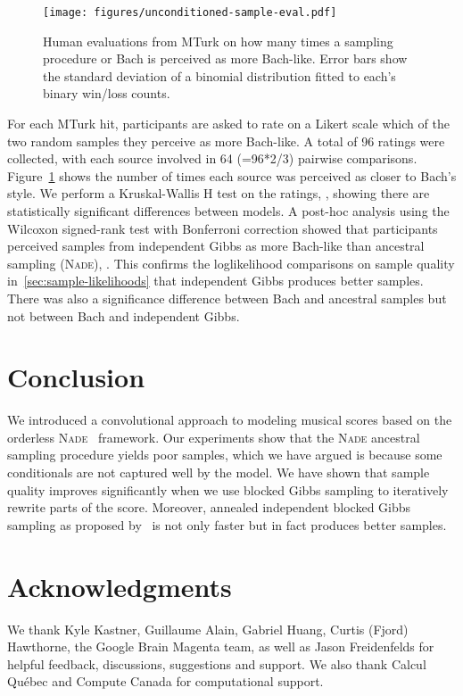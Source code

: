 \documentclass{article}
\newcommand{\nade}{\textsc{Nade}\xspace}
\begin{document}
\begin{figure}
\begin{center}
\texttt{[image: figures/unconditioned-sample-eval.pdf]}
\end{center}
\caption{
Human evaluations from MTurk on how many times a sampling procedure or Bach is perceived as more Bach-like.  Error bars show the standard deviation of a binomial distribution fitted to each's binary win/loss counts.}

\label{fig:unconditionedevaluation}
\end{figure}

For each MTurk hit, participants are asked to rate on a Likert scale which of the two random samples they perceive as more Bach-like.
A total of 96 ratings were collected, with each source involved in 64 (=96*2/3) pairwise comparisons.
Figure~\ref{fig:unconditionedevaluation} shows the number of times each source was perceived as closer to Bach's style. We perform a Kruskal-Wallis H test on the ratings, , showing there are statistically significant differences between models.  A post-hoc analysis using the Wilcoxon signed-rank test with Bonferroni correction showed that participants perceived samples from independent Gibbs as more Bach-like than ancestral sampling (\nade), .  This confirms the loglikelihood comparisons on sample quality in~\ref{sec:sample-likelihoods} that independent Gibbs produces better samples.
There was also a significance difference between Bach and ancestral samples but not between Bach and independent Gibbs. 

\section{Conclusion} \label{sec:conclusion} 

We introduced a convolutional approach to modeling musical scores based on the orderless \nade~\cite{uria2016neural} framework.
Our experiments show that the \nade ancestral sampling procedure yields poor samples,
which we have argued is because some conditionals are not captured well by the model.
We have shown that sample quality improves significantly when we use blocked Gibbs sampling to iteratively rewrite parts of the score.
Moreover, annealed independent blocked Gibbs sampling as proposed by~\cite{yao2014equivalence}
is not only faster but in fact produces better samples.











\section*{Acknowledgments}

We thank Kyle Kastner, Guillaume Alain, Gabriel Huang, Curtis (Fjord) Hawthorne, the Google Brain Magenta team, as well as Jason Freidenfelds for helpful feedback, discussions, suggestions and support.
We also thank Calcul Qu\'ebec and Compute Canada for computational support.


\end{document}
